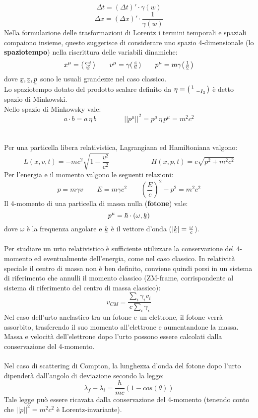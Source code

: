\documentclass{article}
\begin{document}
$$\Delta t = (\Delta t)'\cdot\gamma(w)$$
$$ \Delta x = (\Delta x)'\cdot\frac{1}{\gamma(w)} $$
Nella formulazione delle trasformazioni di Lorentz i termini temporali e spaziali compaiono insieme, questo suggerisce di considerare uno spazio 4-dimensionale (lo \textbf{spaziotempo}) nella riscrittura delle variabili dinamiche:
$$ x^\mu=\begin{psmallmatrix} c\cdot  t\\ \ubar{x} \end{psmallmatrix} \qquad v^\mu = \gamma\begin{psmallmatrix} c\\ \ubar{v} \end{psmallmatrix} \qquad p^\mu=m\gamma \begin{psmallmatrix} 1\\ \ubar{v} \end{psmallmatrix}$$
dove $\ubar{x},\ubar{v},\ubar{p}$ sono le usuali grandezze nel caso classico.\\
Lo spaziotempo dotato del prodotto scalare definito da $\eta=\begin{psmallmatrix} 1 & \\ & -I_3 \end{psmallmatrix}$ è detto spazio di Minkowski.\\
Nello spazio di Minkowsky vale:
$$ a\cdot b=a\,\eta\,b \qquad\qquad ||p^\mu||^2=p^\mu\,\eta\,p^\mu=m^2c^2 $$
\\\\
Per una particella libera relativistica, Lagrangiana ed Hamiltoniana valgono:
$$ L(x,v,t)=-mc^2\sqrt{1-\frac{v^2}{c^2}}  \qquad \qquad \qquad H(x,p,t)=c\sqrt{p^2+m^2c^2}$$
Per l'energia e il momento valgono le seguenti relazioni:
$$ p=m\gamma v \qquad E=m\gamma c^2 \qquad \left(\frac{E}{c}\right)^2-p^2=m^2c^2 $$
Il 4-momento di una particella di massa nulla (\textbf{fotone}) vale:
$$ p^\mu=\hbar\cdot (\omega, \ubar{k}) $$
dove $\omega$ è la frequenza angolare e $\ubar{k}$ è il vettore d'onda ($|\ubar{k}|=\frac{\omega}{c}$).\\\\
Per studiare un urto relativistico è sufficiente utilizzare la conservazione del 4-momento ed eventualmente dell'energia, come nel caso classico. In relatività speciale il centro di massa non è ben definito, conviene quindi porsi in un sistema di riferimento che annulli il momento classico (ZM-frame, corrispondente al sistema di riferimento del centro di massa classico):
$$ v_{CM}=\frac{\sum_i\gamma_iv_i}{c\sum_i\gamma_i} $$
Nel caso dell'urto anelastico tra un fotone e un elettrone, il fotone verrà assorbito, trasferendo il suo momento all'elettrone e aumentandone la massa. Massa e velocità dell'elettrone dopo l'urto possono essere calcolati dalla conservazione del 4-momento.\\\\
Nel caso di scattering di Compton, la lunghezza d'onda del fotone dopo l'urto dipenderà dall'angolo di deviazione secondo la legge:
$$ \lambda_f-\lambda_i=\frac{h}{mc}(1-cos(\theta)) $$
Tale legge può essere ricavata dalla conservazione del 4-momento (tenendo conto che $||p||^2=m^2c^2$ è Lorentz-invariante).
\end{document}
